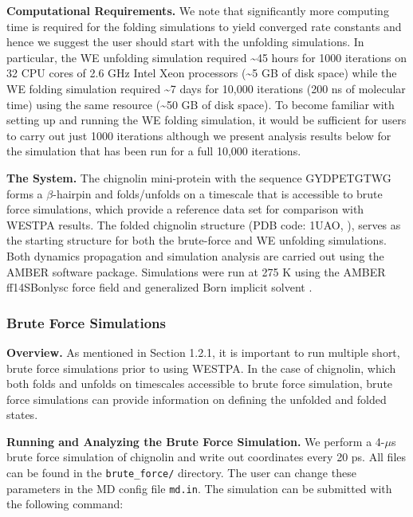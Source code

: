 \documentclass[9pt,tutorial]{livecoms}
\begin{document}
\textbf{Computational Requirements.} We note that significantly more computing time is required for the folding simulations to yield converged rate constants and hence we suggest the user should start with the unfolding simulations. 
In particular, the WE unfolding simulation required \textasciitilde 45 hours for 1000 iterations on 32 CPU cores of 2.6 GHz Intel Xeon processors (\textasciitilde 5 GB of disk space) while the WE folding simulation required \textasciitilde 7 days for 10,000 iterations (200 ns of molecular time) using the same resource (\textasciitilde 50 GB of disk space). 
To become familiar with setting up and running the WE folding simulation, it would be sufficient for users to carry out just 1000 iterations although we present analysis results below for the simulation that has been run for a full 10,000 iterations. 

\textbf{The System.} The chignolin mini-protein with the sequence GYDPETGTWG forms a $\beta$-hairpin and folds/unfolds on a timescale that is accessible to brute force simulations, which provide a reference data set for comparison with WESTPA results. 
The folded chignolin structure (PDB code: 1UAO, \citep{Honda2004}), serves as the starting structure for both the brute-force and WE unfolding simulations. 
Both dynamics propagation and simulation analysis are carried out using the AMBER software package. 
Simulations were run at 275 K using the AMBER ff14SBonlysc force field \citep{ff} and generalized Born implicit solvent \citep{implicit_solvent}. 

\subsubsection{Brute Force Simulations}

\textbf{Overview.} As mentioned in Section 1.2.1, it is important to run multiple short, brute force simulations prior to using WESTPA. 
In the case of chignolin, which both folds and unfolds on timescales accessible to brute force simulation, brute force simulations can provide information on defining the unfolded and folded states. 
 
\textbf{Running and Analyzing the Brute Force Simulation.} We perform a 4-$\mu$s brute force simulation of chignolin and write out coordinates every 20 ps. 
All files can be found in the \verb|brute_force/| directory. 
The user can change these parameters in the MD config file \verb|md.in|. 
The simulation can be submitted with the following command:
 
\end{document}
